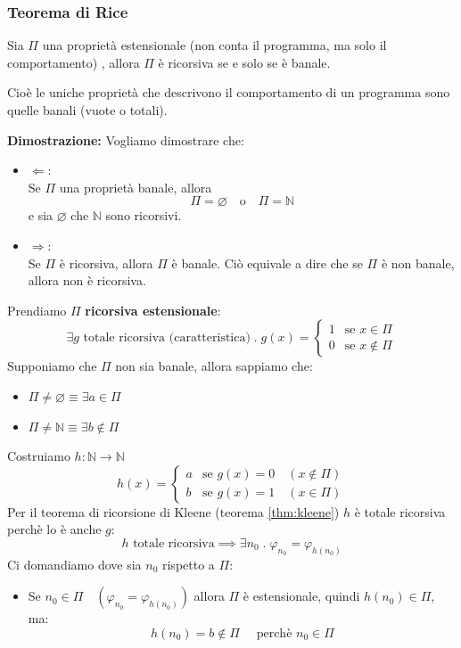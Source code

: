 \documentclass[a4paper]{article}
\begin{document}
\subsubsection{Teorema di Rice}
\begin{theorem}
  Sia \( \Pi  \) una proprietà estensionale (non conta il programma, ma solo il comportamento)
  , allora \( \Pi  \) è ricorsiva se e solo se è banale.

  Cioè le uniche proprietà che descrivono il comportamento di un programma sono 
  quelle banali (vuote o totali).

  \vspace{1em}
  \noindent
  \textbf{Dimostrazione:} Vogliamo dimostrare che:
  \begin{itemize}
    \item \( \Leftarrow \):\\
      Se \( \Pi  \) una proprietà banale, allora
      \[
        \Pi = \varnothing \quad \text{o} \quad \Pi  = \mathbb{N}
      \] 
      e sia \( \varnothing \) che \( \mathbb{N} \) sono ricorsivi.

    \item \( \Rightarrow \):\\
      Se \( \Pi  \) è ricorsiva, allora \( \Pi \) è banale. Ciò equivale a dire
      che se \( \Pi  \) è non banale, allora non è ricorsiva.
  \end{itemize}
  Prendiamo \( \Pi  \) \textbf{ricorsiva estensionale}:
  \[
    \exists g \text{ totale ricorsiva (caratteristica)} \;.\; g(x) =
    \begin{cases}
      1 & \text{se } x \in \Pi \\
      0 & \text{se } x \notin \Pi
    \end{cases}
  \] 
  Supponiamo che \( \Pi  \) non sia banale, allora sappiamo che:
  \begin{itemize}
    \item 
      \(
        \Pi \neq \varnothing \equiv \exists a \in \Pi
      \) 

    \item \( \Pi \neq \mathbb{N} \equiv \exists b \notin \Pi  \) 
  \end{itemize}
  Costruiamo \( h: \mathbb{N} \to \mathbb{N} \) 
  \[
    h(x) =
    \begin{cases}
      a & \text{se } g(x) = 0 \quad (x \notin \Pi) \\
      b & \text{se } g(x) = 1 \quad (x \in \Pi)
    \end{cases}
  \] 
  Per il teorema di ricorsione di Kleene (teorema \ref{thm:kleene}) \( h \) è totale
  ricorsiva perchè lo è anche \( g \):
  \[
    h \text{ totale ricorsiva} \implies \exists n_0 \;.\; \varphi_{n_0} = \varphi_{h(n_0)}
  \] 
  Ci domandiamo dove sia \( n_0 \) rispetto a \( \Pi \):
  \begin{itemize}
    \item 
      Se \( n_0 \in \Pi \quad (\varphi_{n_0} = \varphi_{h(n_0)}) \) allora \( \Pi  \) è
      estensionale, quindi \( h(n_0) \in \Pi  \), ma:
      \[
        h(n_0) = b \notin \Pi \quad \text{ perchè } n_0 \in \Pi 
      \] 


\end{itemize}
\end{theorem}
\end{document}

